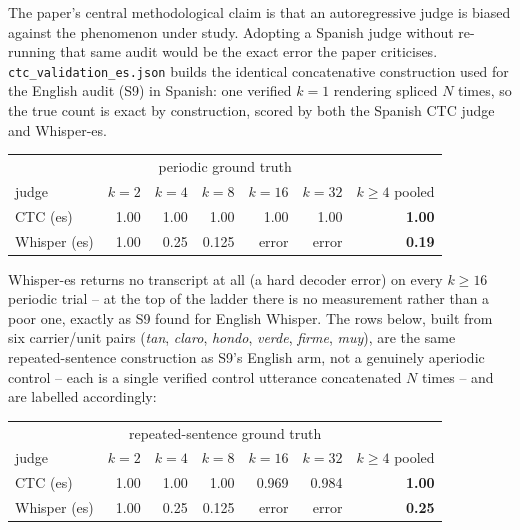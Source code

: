 \documentclass[11pt]{article}
\begin{document}
The paper's central methodological claim is that an autoregressive judge is
biased against the phenomenon under study. Adopting a Spanish judge without
re-running that same audit would be the exact error the paper criticises.
\texttt{ctc\_validation\_es.json} builds the identical concatenative
construction used for the English audit (S9) in Spanish: one verified
$k{=}1$ rendering spliced $N$ times, so the true count is exact by
construction, scored by both the Spanish CTC judge and Whisper-es.

\begin{center}
\begin{tabular}{@{}lrrrrrr@{}}
\toprule
 & \multicolumn{5}{c}{periodic ground truth} & \\
judge & $k{=}2$ & $k{=}4$ & $k{=}8$ & $k{=}16$ & $k{=}32$ & $k{\ge}4$ pooled \\
\midrule
CTC (es)      & 1.00 & 1.00 & 1.00  & 1.00  & 1.00  & \textbf{1.00} \\
Whisper (es)  & 1.00 & 0.25 & 0.125 & error & error & \textbf{0.19} \\
\bottomrule
\end{tabular}
\end{center}

\noindent Whisper-es returns no transcript at all (a hard decoder error) on
every $k{\ge}16$ periodic trial -- at the top of the ladder there is no
measurement rather than a poor one, exactly as S9 found for English Whisper.
The rows below, built from six carrier/unit pairs (\emph{tan},
\emph{claro}, \emph{hondo}, \emph{verde}, \emph{firme}, \emph{muy}), are the
same repeated-sentence construction as S9's English arm, not a genuinely
aperiodic control -- each is a single verified control utterance concatenated
$N$ times -- and are labelled accordingly:

\begin{center}
\begin{tabular}{@{}lrrrrrr@{}}
\toprule
 & \multicolumn{5}{c}{repeated-sentence ground truth} & \\
judge & $k{=}2$ & $k{=}4$ & $k{=}8$ & $k{=}16$ & $k{=}32$ & $k{\ge}4$ pooled \\
\midrule
CTC (es)      & 1.00 & 1.00 & 1.00  & 0.969 & 0.984 & \textbf{1.00} \\
Whisper (es)  & 1.00 & 0.25 & 0.125 & error & error & \textbf{0.25} \\
\bottomrule
\end{tabular}
\end{center}
\end{document}
